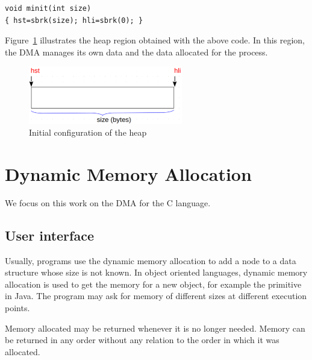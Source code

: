 \begin{lstlisting}[style=cstyle]
void minit(int size) 
{ hst=sbrk(size); hli=sbrk(0); }
\end{lstlisting}

Figure~\ref{fig:init} illustrates the heap region obtained with the above code.
In this region, the DMA manages its own data and the data allocated for the process.
 
\begin{figure}[htbp]
    \begin{center}
        \includegraphics[width=0.6\textwidth]{figures/sbrk}
    \caption{Initial configuration of the heap}
    \label{fig:init}
    \end{center}
\end{figure}





\section{Dynamic Memory Allocation}
\label{sec:dma}

We focus on this work on the DMA for the C language.

\subsection{User interface}

Usually, programs use the dynamic memory allocation to add a node to a data structure whose size is not known. In object oriented languages, dynamic memory allocation is used to get the memory for a new object, for example the primitive  in Java. The program may ask for memory of different sizes at different execution points.

Memory allocated may be returned whenever it is no longer needed. Memory can be returned in any order without any relation to the order in which it was allocated. 

